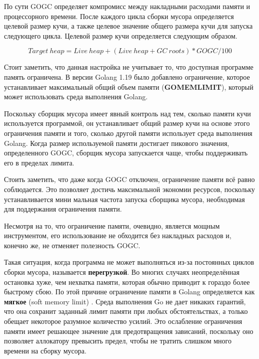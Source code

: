 По сути GOGC определяет компромисс между накладными расходами памяти и процессорного времени. После каждого цикла сборки мусора определяется целевой размер кучи, а также целевое значение общего размера кучи для запуска следующего цикла. Целевой размер кучи определяется следующим образом. \cite{golang_gc_guide}

\begin{equation}
	Target\ heap = Live\ heap + (Live\ heap + GC\ roots) * GOGC / 100
\end{equation}

Стоит заметить, что данная настройка не учитывает то, что доступная программе память ограничена. В версии Golang 1.19 было добавлено ограничение, которое устанавливает максимальный общий объем памяти (\textbf{GOMEMLIMIT}), который может использовать среда выполнения Golang. \cite{golang_1_19} \cite{golang_proposal_limit}

Поскольку сборщик мусора имеет явный контроль над тем, сколько памяти кучи используется программой, он устанавливает общий размер кучи на основе этого ограничения памяти и того, сколько другой памяти использует среда выполнения Golang. Когда размер используемой памяти достигает пикового значения, определенного GOGC, сборщик мусора запускается чаще, чтобы поддерживать его в пределах лимита. \cite{golang_gc_guide}

Стоить заметить, что даже когда GOGC отключен, ограничение памяти всё равно соблюдается. Это позволяет достичь максимальной экономии ресурсов, поскольку устанавливается мини \cite{golang_gc_guide}мальная частота запуска сборщика мусора, необходимая для поддержания ограничения памяти.

Несмотря на то, что ограничение памяти, очевидно, является мощным инструментом, его использование не обходится без накладных расходов и, конечно же, не отменяет полезность GOGC. \cite{golang_gc_guide}

Такая ситуация, когда программа не может выполняться из-за постоянных циклов сборки мусора, называется \textbf{перегрузкой}. Во многих случаях неопределённая остановка хуже, чем нехватка памяти, которая обычно приводит к гораздо более быстрому сбою. По этой причине ограничение памяти в Golang определяется как \textbf{мягкое} (soft memory limit) \cite{golang_proposal_limit}. Среда выполнения Go не дает никаких гарантий, что она сохранит заданный лимит памяти при любых обстоятельствах, а только обещает некоторое разумное количество усилий. Это ослабление ограничения памяти имеет решающее значение для предотвращения зависаний, поскольку оно позволяет аллокатору превысить предел, чтобы не тратить слишком много времени на сборку мусора. \cite{golang_gc_guide}

